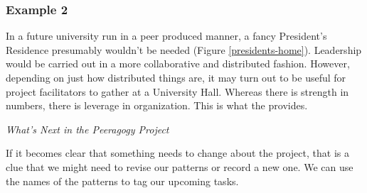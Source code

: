 \subsubsection*{Example 2}
In a future university run in a peer produced manner, a fancy
President's Residence presumably wouldn't be needed (Figure \ref{presidents-home}).  Leadership would
be carried out in a more collaborative and distributed fashion.
However, depending on just how distributed things are, it may turn out
to be useful for project facilitators to gather at a University Hall.
Whereas there is strength in numbers, there is leverage in
organization.  This is what the  provides.


\begin{framed}
\noindent
\emph{What's Next in the Peeragogy Project}
\begin{collectinmacro}{\RoadmapWN}{}{}
If it becomes clear that something needs to change about the project, that is a clue that we might need to revise our patterns or record a new one.  We can use the names of the patterns to tag our upcoming tasks.
\end{collectinmacro}
\RoadmapWN
\end{framed}


